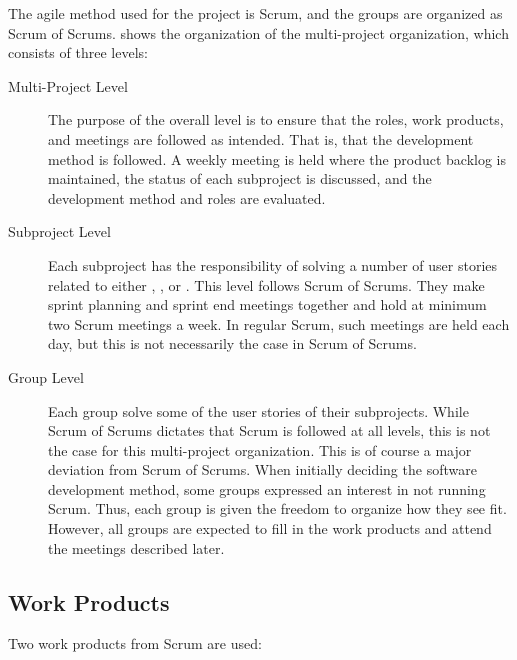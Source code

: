 The agile method used for the project is Scrum, and the groups are organized as Scrum of Scrums.  shows the organization of the multi-project organization, which consists of three levels:

\begin{description}
  \item[Multi-Project Level] The purpose of the overall level is to ensure that the roles, work products, and meetings are followed as intended. That is, that the development method is followed. A weekly meeting is held where the product backlog is maintained, the status of each subproject is discussed, and the development method and roles are evaluated.
  \item[Subproject Level] Each subproject has the responsibility of solving a number of user stories related to either \gui, \db, or \bd. This level follows Scrum of Scrums. They make sprint planning and sprint end meetings together and hold at minimum two Scrum meetings a week. In regular Scrum, such meetings are held each day, but this is not necessarily the case in Scrum of Scrums.
  \item[Group Level] Each group solve some of the user stories of their subprojects. While Scrum of Scrums dictates that Scrum is followed at all levels, this is not the case for this multi-project organization. This is of course a major deviation from Scrum of Scrums. When initially deciding the software development method, some groups expressed an interest in not running Scrum. Thus, each group is given the freedom to organize how they see fit. However, all groups are expected to fill in the work products and attend the meetings described later.
\end{description}


\subsection{Work Products}
Two work products from Scrum are used:

